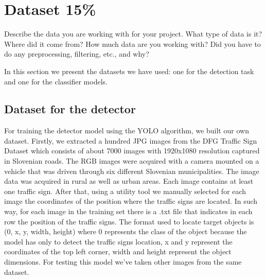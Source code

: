 \section{Dataset 15\%}
Describe the data you are working with for your project. What type of data is it? Where did it come from? How much data are you working with? Did you have to do any preprocessing, filtering, etc., and why?

In this section we present the datasets we have used: one for the detection task and one for the classifier models. 

\subsection{Dataset for the detector}
For training the detector model using the YOLO algorithm, we built our own dataset. Firstly, we extracted a hundred JPG images from the DFG Traffic Sign Dataset which consists of about 7000 images with 1920x1080 resolution captured in Slovenian roads. The RGB images were acquired with a camera mounted on a vehicle that was driven through six different Slovenian municipalities. The image data was acquired in rural as well as urban areas. Each image contains at least one traffic sign. After that, using a utility tool we manually selected for each image the coordinates of the position where the traffic signs are located. In such way, for each image in the training set there is a .txt file that indicates in each row the position of the traffic signs. The format used to locate target objects is (0, x, y, width, height) where 0 represents the class of the object because the model has only to detect the traffic signs location, x and y represent the coordinates of the top left corner, width and height represent the object dimensions. For testing this model we've taken other images from the same dataset.

